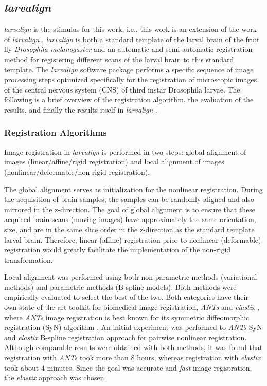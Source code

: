 \documentclass{book}
\begin{document}
	\subsection{\emph{larvalign}}
	\emph{{larvalign}} \cite{larvalign} is the stimulus for this work, i.e., this work is an extension of the work of \emph{{larvalign}} \cite{larvalign}. \emph{{larvalign}} \cite{larvalign} is both a standard template of the larval brain of the fruit fly \emph{Drosophila melanogaster} and an automatic and semi-automatic registration method for registering different scans of the larval brain to this standard template. The \emph{{larvalign}} \cite{larvalign} software package performs a specific sequence of image processing steps optimized specifically for the registration of microscopic images of the central nervous system (CNS) of third instar Drosophila larvae. The following is a brief overview of the registration algorithm, the evaluation of the results, and finally the results itself in \emph{{larvalign}} \cite{larvalign}.
	
	\subsubsection{Registration Algorithms}
	\label{subsubsection:registration_algo}
	Image registration in \emph{{larvalign}} is performed in two steps: global alignment of images (linear/affine/rigid registration) and local alignment of images (nonlinear/deformable/non-rigid registration).
	
	The global alignment serves as initialization for the nonlinear registration. During the acquisition of brain samples, the samples can be randomly aligned and also mirrored in the z-direction. The goal of global alignment is to ensure that these acquired brain scans (moving images) have approximately the same orientation, size, and are in the same slice order in the z-direction as the standard template larval brain.  Therefore, linear (affine) registration prior to nonlinear (deformable) registration would greatly facilitate the implementation of the non-rigid transformation.
	
	Local alignment was performed using both non-parametric methods (variational methods) and parametric methods (B-spline models). Both methods were empirically evaluated to select the best of the two. Both categories have their own state-of-the-art toolkit for biomedical image registration, \emph{ANTs} \cite{Avants2011ARE} and \emph{elastix} \cite{5338015}, where \emph{ANTs} image registration is best known for its symmetric diffeomorphic registration (SyN) algorithm \cite{Avants2008SymmetricDI}. An initial experiment was performed to \emph{ANTs} SyN and \emph{elastix} B-spline registration approach for pairwise nonlinear registration. Although comparable results were obtained with both methods, it was found that registration with \emph{ANTs} took more than 8 hours, whereas registration with \emph{elastix} took about 4 minutes. Since the goal was accurate and \emph{fast} image registration, the \emph{elastix} approach was chosen.
	
\end{document}
